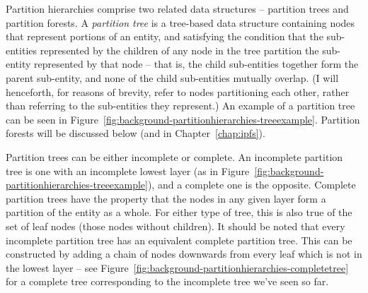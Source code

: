 Partition hierarchies comprise two related data structures -- partition trees and partition forests. A \emph{partition tree} is a tree-based data structure containing nodes that represent portions of an entity, and satisfying the condition that the sub-entities represented by the children of any node in the tree partition the sub-entity represented by that node -- that is, the child sub-entities together form the parent sub-entity, and none of the child sub-entities mutually overlap. (I will henceforth, for reasons of brevity, refer to nodes partitioning each other, rather than referring to the sub-entities they represent.) An example of a partition tree can be seen in Figure~\ref{fig:background-partitionhierarchies-treeexample}. Partition forests will be discussed below (and in Chapter~\ref{chap:ipfs}).


Partition trees can be either incomplete or complete. An incomplete partition tree is one with an incomplete lowest layer (as in Figure~\ref{fig:background-partitionhierarchies-treeexample}), and a complete one is the opposite. Complete partition trees have the property that the nodes in any given layer form a partition of the entity as a whole. For either type of tree, this is also true of the set of leaf nodes (those nodes without children). It should be noted that every incomplete partition tree has an equivalent complete partition tree. This can be constructed by adding a chain of nodes downwards from every leaf which is not in the lowest layer -- see Figure~\ref{fig:background-partitionhierarchies-completetree} for a complete tree corresponding to the incomplete tree we've seen so far.


